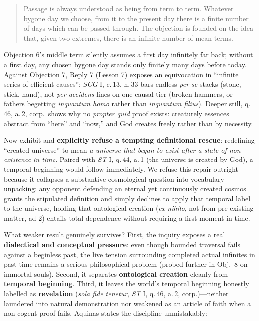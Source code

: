 \begin{quote}
Passage is always understood as being from term to term. Whatever bygone day we choose, from it to the present day there is a finite number of days which can be passed through. The objection is founded on the idea that, given two extremes, there is an infinite number of mean terms.
\end{quote}

Objection 6's middle term silently assumes a first day infinitely far back; without a first day, any chosen bygone day stands only finitely many days before today. Against Objection 7, Reply 7 (Lesson 7) exposes an equivocation in ``infinite series of efficient causes'': \emph{SCG} I, c.\,13, n.\,33 bars endless \emph{per se} stacks (stone, stick, hand), not \emph{per accidens} lines on one causal tier (broken hammers, or fathers begetting \emph{inquantum homo} rather than \emph{inquantum filius}). Deeper still, q.\,46, a.\,2, corp.\ shows why no \emph{propter quid} proof exists: creaturely essences abstract from ``here'' and ``now,'' and God creates freely rather than by necessity.

Now exhibit and \textbf{explicitly refuse a tempting definitional rescue}: redefining ``created universe'' to mean \emph{a universe that began to exist after a state of non-existence in time}. Paired with \emph{ST} I, q.\,44, a.\,1 (the universe is created by God), a temporal beginning would follow immediately. We refuse this repair outright because it collapses a substantive cosmological question into vocabulary unpacking: any opponent defending an eternal yet continuously created cosmos grants the stipulated definition and simply declines to apply that temporal label to the universe, holding that ontological creation (\emph{ex nihilo}, not from pre-existing matter, ad 2) entails total dependence without requiring a first moment in time.

What weaker result genuinely survives? First, the inquiry exposes a real \textbf{dialectical and conceptual pressure}: even though bounded traversal fails against a beginless past, the live tension surrounding completed actual infinites in past time remains a serious philosophical problem (probed further in Obj.\ 8 on immortal souls). Second, it separates \textbf{ontological creation} cleanly from \textbf{temporal beginning}. Third, it leaves the world's temporal beginning honestly labelled as \textbf{revelation} (\emph{sola fide tenetur}, \emph{ST} I, q.\,46, a.\,2, corp.)---neither laundered into natural demonstration nor weakened as an article of faith when a non-cogent proof fails. Aquinas states the discipline unmistakably:

